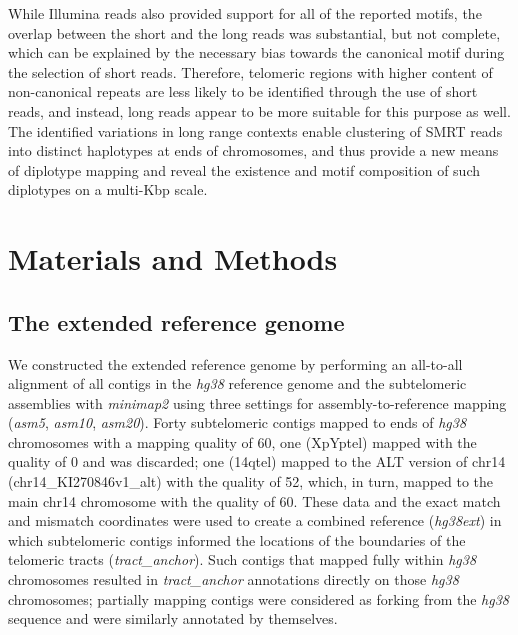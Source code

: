 \documentclass{article}
\begin{document}
While Illumina reads also provided support for all of the reported motifs, the overlap between the short and the long reads was substantial, but not complete, which can be explained by the necessary bias towards the canonical motif during the selection of short reads.
Therefore, telomeric regions with higher content of non-canonical repeats are less likely to be identified through the use of short reads, and instead, long reads appear to be more suitable for this purpose as well.
The identified variations in long range contexts enable clustering of SMRT reads into distinct haplotypes at ends of chromosomes, and thus provide a new means of diplotype mapping and reveal the existence and motif composition of such diplotypes on a multi-Kbp scale.

\section*{Materials and Methods}  \label{sec:methods}

\subsection*{The extended reference genome}
We constructed the extended reference genome by performing an all-to-all alignment of all contigs in the \textit{hg38} reference genome \cite{grch38,hg38} and the subtelomeric assemblies \cite{riethman2014} with \textit{minimap2} \cite{minimap} using three settings for assembly-to-reference mapping (\textit{asm5}, \textit{asm10}, \textit{asm20}).
Forty subtelomeric contigs mapped to ends of \textit{hg38} chromosomes with a mapping quality of 60, one (XpYptel) mapped with the quality of 0 and was discarded; one (14qtel) mapped to the ALT version of chr14 (chr14\_KI270846v1\_alt) with the quality of 52, which, in turn, mapped to the main chr14 chromosome with the quality of 60.
These data and the exact match and mismatch coordinates were used to create a combined reference (\textit{hg38ext}) in which subtelomeric contigs informed the locations of the boundaries of the telomeric tracts (\textit{tract\_anchor}).
Such contigs that mapped fully within \textit{hg38} chromosomes resulted in \textit{tract\_anchor} annotations directly on those \textit{hg38} chromosomes; partially mapping contigs were considered as forking from the \textit{hg38} sequence and were similarly annotated by themselves.
\end{document}
